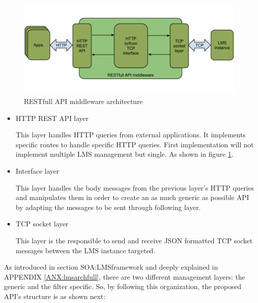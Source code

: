 \begin{figure}[!htb]
\begin{center}
\includegraphics[width=1\textwidth]{./images/RESTAPI.png}
\caption{RESTfull API middleware architecture}
\label{F:restAPI}
\end{center}
\end{figure}

\begin{itemize}
\item HTTP REST API layer \hfill

This layer handles HTTP queries from external applications. It implements specific routes to handle specific HTTP queries. First implementation will not implement multiple LMS management but single. As shown in figure \ref{F:restAPI}.

\item Interface layer \hfill

This layer handles the body messages from the previous layer's HTTP queries and manipulates them in order to create an as much generic as possible API by adapting the messages to be sent through following layer.

\item TCP socket layer \hfill

This layer is the responsible to send and receive JSON formatted TCP socket messages between the LMS instance targeted.
\end{itemize}

As introduced in section {SOA:LMSframework} and deeply explained in APPENDIX \ref{ANX:lmsarchfull}, there are two different management layers: the generic and the filter specific. So, by following this organization, the proposed API's structure is as shown next:

